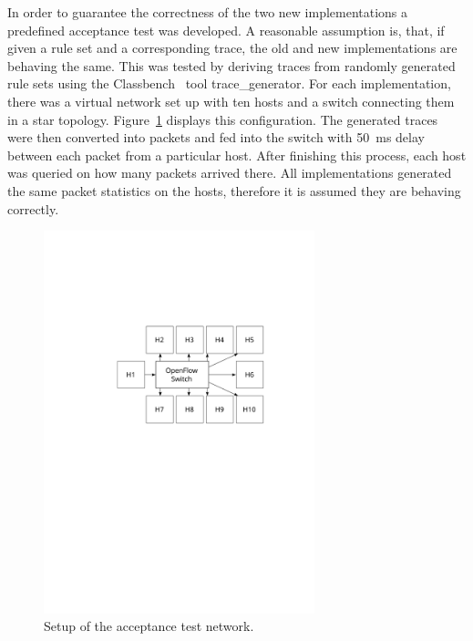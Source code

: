 \documentclass[a4paper,
		12pt,
		parskip=full,
		titlepage
		]{scrartcl}
\begin{document}
In order to guarantee the correctness of the two new implementations a predefined acceptance test was developed.
A reasonable assumption is, that, if given a rule set and a corresponding trace, 
the old and new implementations are behaving the same.
This was tested by deriving traces from randomly generated rule sets using 
the Classbench~\cite{classbench_website} tool \textsf{trace\_generator}.
For each implementation, there was a virtual network set up with ten hosts and a switch connecting them in a star topology.
Figure~\ref{fig:ofswitch-acctest} displays this configuration.
The generated traces were then converted into packets and fed into the switch with 50\ ms delay between each packet from a particular host.
After finishing this process, each host was queried on how many packets arrived there.
All implementations generated the same packet statistics on the hosts, therefore it is assumed they are behaving correctly.

\begin{figure}
\centering
\includegraphics[width=0.7\textwidth]{images/ofswitch-acctest}
\caption{Setup of the acceptance test network.}
\label{fig:ofswitch-acctest}
\end{figure}
\end{document}

